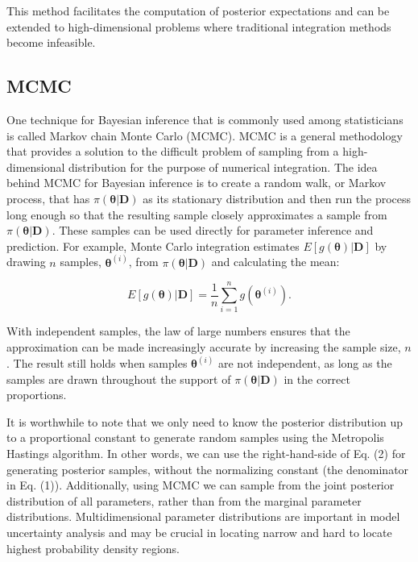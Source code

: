 This method facilitates the computation of posterior expectations and can be extended to high-dimensional problems where traditional integration methods become infeasible.

\subsection{MCMC}

One technique for Bayesian inference that is commonly used among statisticians is called Markov chain Monte Carlo (MCMC). MCMC is a general methodology that provides a solution to the difficult problem of sampling from a high-dimensional distribution for the purpose of numerical integration. The idea behind MCMC for Bayesian inference is to create a random walk, or Markov process, that has \(\pi(\boldsymbol{\theta}|\mathbf{D})\) as its stationary distribution and then run the process long enough so that the resulting sample closely approximates a sample from \(\pi(\boldsymbol{\theta}|\mathbf{D})\). These samples can be used directly for parameter inference and prediction. For example, Monte Carlo integration estimates \(E[g(\boldsymbol{\theta})|\mathbf{D}]\) by drawing \(n\) samples, \(\boldsymbol{\theta}^{(i)}\), from \(\pi(\boldsymbol{\theta}|\mathbf{D})\) and calculating the mean:

\begin{equation}
E[g(\boldsymbol{\theta})|\mathbf{D}] = \frac{1}{n}\sum_{i=1}^{n}g(\boldsymbol{\theta}^{(i)}).
\end{equation}

With independent samples, the law of large numbers ensures that the approximation can be made increasingly accurate by increasing the sample size, \(n\). The result still holds when samples \(\boldsymbol{\theta}^{(i)}\) are not independent, as long as the samples are drawn throughout the support of \(\pi(\boldsymbol{\theta}|\mathbf{D})\) in the correct proportions.

It is worthwhile to note that we only need to know the posterior distribution up to a proportional constant to generate random samples using the Metropolis Hastings algorithm. In other words, we can use the right-hand-side of Eq. (2) for generating posterior samples, without the normalizing constant (the denominator in Eq. (1)). Additionally, using MCMC we can sample from the joint posterior distribution of all parameters, rather than from the marginal parameter distributions. Multidimensional parameter distributions are important in model uncertainty analysis and may be crucial in locating narrow and hard to locate highest probability density regions.


